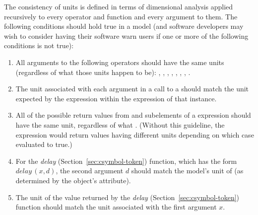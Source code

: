 The consistency of units is defined in terms of dimensional
analysis applied recursively to every operator and function and
every argument to them.  The following conditions should hold true
in a model (and software developers may wish to consider having
their software warn users if one or more of the following
conditions is not true):

\begin{enumerate}

\item All arguments to the following operators should have the same
  units (regardless of what those units happen to be):
  , , ,  ,
  , , , .

\item The unit associated with each argument in a call to a
  \FunctionDefinition should match the unit expected by the
   expression within the  expression of
  that \FunctionDefinition instance.


\item All of the possible return values from  and
   subelements of a  expression
  should have the same unit, regardless of what .
  (Without this guideline, the  expression would
  return values having different units depending on which case
  evaluated to true.)

\item For the \emph{delay} 
  (Section~\ref{sec:csymbol-token}) function, which has the form
  $\textit{delay}\,(x, d)$, the second argument $d$ should match
  the model's unit of  (as determined by the \Model
  object's  attribute).

\item The unit of the value returned by the \emph{delay}
   (Section~\ref{sec:csymbol-token}) function
  should match the unit associated with the first argument $x$.



\end{enumerate}

